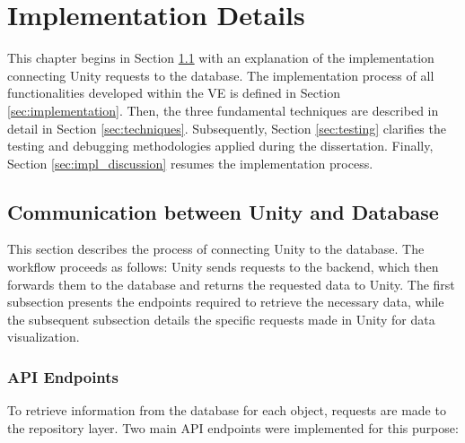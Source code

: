 
%
\chapter{Implementation Details}
\label{cha:system_implementation}
This chapter begins in Section \ref{sec:communication} with an explanation of the implementation connecting Unity requests to the database.
The implementation process of all functionalities developed within the \gls{VE} is defined in Section \ref{sec:implementation}.
Then, the three fundamental techniques are described in detail in Section \ref{sec:techniques}.
Subsequently, Section \ref{sec:testing} clarifies the testing and debugging methodologies applied during the dissertation.
Finally, Section \ref{sec:impl_discussion} resumes the implementation process.

\section{Communication between Unity and Database}
\label{sec:communication}
This section describes the process of connecting Unity to the database. 
The workflow proceeds as follows: Unity sends requests to the backend, which then forwards them to the database and returns the requested data to Unity. 
The first subsection presents the endpoints required to retrieve the necessary data, while the subsequent subsection details the specific requests made in Unity for data visualization.

\subsection{\gls{API} Endpoints}

To retrieve information from the database for each object, requests are made to the repository layer. 
Two main \gls{API} endpoints were implemented for this purpose:

